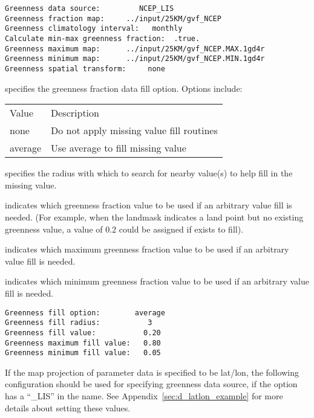  \begin{Verbatim}[frame=single]
Greenness data source:         NCEP_LIS
Greenness fraction map:     ../input/25KM/gvf_NCEP
Greenness climatology interval:   monthly
Calculate min-max greenness fraction:  .true.
Greenness maximum map:      ../input/25KM/gvf_NCEP.MAX.1gd4r
Greenness minimum map:      ../input/25KM/gvf_NCEP.MIN.1gd4r
Greenness spatial transform:     none
 \end{Verbatim}

 
  specifies the greenness fraction
 data fill option.  Options include:

 \begin{tabular}{ll}
 Value    & Description                               \\
 none     &  Do not apply missing value fill routines \\
 average  &  Use average to fill missing value        \\
 \end{tabular}

  specifies the radius with which
 to search for nearby value(s) to help fill in the missing value.

  indicates which greenness fraction 
 value to be used if an arbitrary value fill is needed. 
 (For example, when the landmask indicates a land point but no existing 
 greenness value, a value of 0.2 could be assigned if 
 exists to fill).

  indicates which maximum greenness
 fraction value to be used if an arbitrary value fill is needed. 

  indicates which minimum greenness
 fraction value to be used if an arbitrary value fill is needed. 
 

 \begin{Verbatim}[frame=single]
Greenness fill option:        average
Greenness fill radius:           3
Greenness fill value:           0.20
Greenness maximum fill value:   0.80
Greenness minimum fill value:   0.05
 \end{Verbatim}

 
 If the map projection of parameter data is specified to be lat/lon, 
 the following configuration should be used for specifying greenness
 data source, if the option has a ``\_LIS'' in the name.
 See Appendix~\ref{sec:d_latlon_example} for more details about
 setting these values.
 

